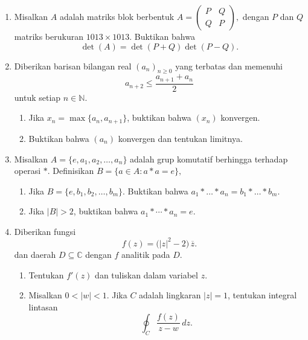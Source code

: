 \documentclass[12pt,twoside]{article}
\begin{document}
\begin{enumerate}
    \item Misalkan $A$ adalah matriks blok berbentuk
          $\displaystyle
              A=
              \begin{pmatrix}
                  P & Q \\
                  Q & P
              \end{pmatrix},
          $
          dengan $P$ dan $Q$ matriks berukuran $1013\times 1013$.
          Buktikan bahwa
          \[
              \det(A)=\det(P+Q)\det(P-Q).
          \]
    \item Diberikan barisan bilangan real $(a_n)_{n \geq 0}$ yang terbatas dan memenuhi
          \[
              a_{n+2}\le \frac{a_{n+1}+a_n}{2}
          \]
          untuk setiap $n\in\mathbb{N}$.
          \begin{enumerate}
              \item Jika
                    $
                        x_n=\max\{a_n,a_{n+1}\}
                    $,
                    buktikan bahwa $(x_n)$ konvergen.
              \item Buktikan bahwa $(a_n)$ konvergen dan tentukan limitnya.
          \end{enumerate}
    \item Misalkan
          $
              A=\{e,a_1,a_2,\ldots,a_n\}
          $
          adalah grup komutatif berhingga terhadap operasi $*$. Definisikan
          $
              B=\{a\in A:a*a=e\},
          $
          \begin{enumerate}
              \item Jika $
                        B=\{e,b_1,b_2,\ldots,b_m\}.
                    $ Buktikan bahwa
                    $
                        a_1*\dots *a_n=b_1*\dots *b_m.
                    $
              \item Jika $|B|>2$, buktikan bahwa
                    $
                        a_1*\cdots*a_n=e.
                    $
          \end{enumerate}
    \item
          Diberikan fungsi
          \[
              f(z)=\bigl(|z|^2-2\bigr)\,\overline{z}.
          \]
          dan daerah $D\subseteq \mathbb{C}$ dengan $f$ analitik pada $D$.
          \begin{enumerate}
              \item Tentukan $f'(z)$ dan tuliskan dalam variabel $z$.
              \item Misalkan $0<|w|<1$. Jika $C$ adalah lingkaran $|z|=1$, tentukan integral lintasan
                    \[
                        \oint_C \frac{f(z)}{z-w}\,dz.
                    \]
          \end{enumerate}
\end{enumerate}
\end{document}
